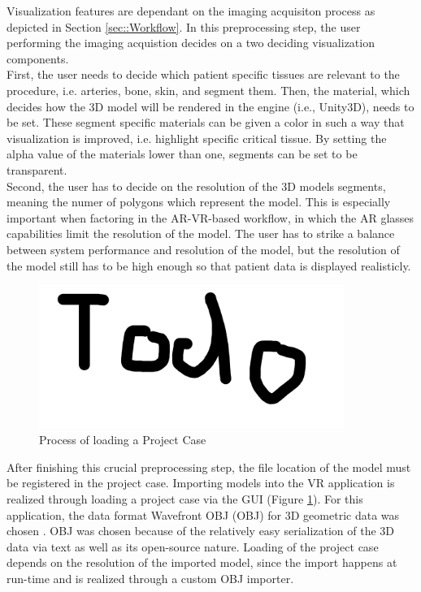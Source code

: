 Visualization features are dependant on the imaging acquisiton process as depicted in Section \ref{sec::Workflow}.
In this preprocessing step, the user performing the imaging acquistion decides on a two deciding visualization components.
\\ First, the user needs to decide which patient specific tissues are relevant to the procedure, i.e. arteries, bone, skin, and segment them.
Then, the material, which decides how the 3D model will be rendered in the engine (i.e., Unity3D), needs to be set.
These segment specific materials can be given a color in such a way that visualization is improved, i.e. highlight specific critical tissue.
By setting the alpha value of the materials lower than one, segments can be set to be transparent.
\\ Second, the user has to decide on the resolution of the 3D models segments, meaning the numer of polygons which represent the model.
This is especially important when factoring in the AR-VR-based workflow, in which the AR glasses capabilities limit the resolution of the model.
The user has to strike a balance between system performance and resolution of the model, but the resolution of the model still has to be high enough so that patient data is displayed realisticly.

\begin{figure}[ht]
  \centering
  \includegraphics[width=375px]{images/todo.png}
  \caption{\label{fig::LoadingProjectCase}Process of loading a Project Case}
\end{figure}

After finishing this crucial preprocessing step, the file location of the model must be registered in the project case.
Importing models into the VR application is realized through loading a project case via the GUI (Figure \ref{fig::LoadingProjectCase}).
For this application, the data format Wavefront OBJ (OBJ) for 3D geometric data was chosen \cite{WavefrontOBJ}.
OBJ was chosen because of the relatively easy serialization of the 3D data via text as well as its open-source nature. 
Loading of the project case depends on the resolution of the imported model, since the import happens at run-time and is realized through a custom OBJ importer. 

